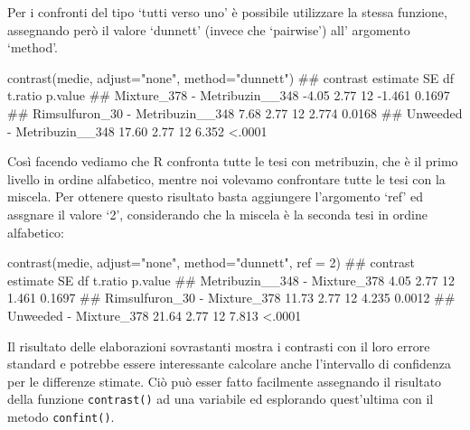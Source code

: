 \documentclass[a4paper,12pt,oneside]{book}
\newenvironment{Shaded}{\begin{snugshade}}{\end{snugshade}}
\newcommand{\DecValTok}[1]{#1}
\newcommand{\StringTok}[1]{#1}
\newcommand{\DocumentationTok}[1]{#1}
\newcommand{\FunctionTok}[1]{#1}
\newcommand{\AttributeTok}[1]{#1}
\newcommand{\NormalTok}[1]{#1}
\begin{document}
\normalsize

Per i confronti del tipo `tutti verso uno' è possibile utilizzare la stessa funzione, assegnando però il valore `dunnett' (invece che `pairwise') all' argomento `method'.

\small

\begin{Shaded}
\begin{Highlighting}[]
\FunctionTok{contrast}\NormalTok{(medie, }\AttributeTok{adjust=}\StringTok{"none"}\NormalTok{, }\AttributeTok{method=}\StringTok{"dunnett"}\NormalTok{)}
\DocumentationTok{\#\#  contrast                         estimate   SE df t.ratio p.value}
\DocumentationTok{\#\#  Mixture\_378 {-} Metribuzin\_\_348       {-}4.05 2.77 12  {-}1.461  0.1697}
\DocumentationTok{\#\#  Rimsulfuron\_30 {-} Metribuzin\_\_348     7.68 2.77 12   2.774  0.0168}
\DocumentationTok{\#\#  Unweeded {-} Metribuzin\_\_348          17.60 2.77 12   6.352  \textless{}.0001}
\end{Highlighting}
\end{Shaded}

\normalsize

Così facendo vediamo che R confronta tutte le tesi con metribuzin, che è il primo livello in ordine alfabetico, mentre noi volevamo confrontare tutte le tesi con la miscela. Per ottenere questo risultato basta aggiungere l'argomento `ref' ed assgnare il valore `2', considerando che la miscela è la seconda tesi in ordine alfabetico:

\small

\begin{Shaded}
\begin{Highlighting}[]
\FunctionTok{contrast}\NormalTok{(medie, }\AttributeTok{adjust=}\StringTok{"none"}\NormalTok{, }\AttributeTok{method=}\StringTok{"dunnett"}\NormalTok{, }\AttributeTok{ref =} \DecValTok{2}\NormalTok{)}
\DocumentationTok{\#\#  contrast                      estimate   SE df t.ratio p.value}
\DocumentationTok{\#\#  Metribuzin\_\_348 {-} Mixture\_378     4.05 2.77 12   1.461  0.1697}
\DocumentationTok{\#\#  Rimsulfuron\_30 {-} Mixture\_378     11.73 2.77 12   4.235  0.0012}
\DocumentationTok{\#\#  Unweeded {-} Mixture\_378           21.64 2.77 12   7.813  \textless{}.0001}
\end{Highlighting}
\end{Shaded}

\normalsize

Il risultato delle elaborazioni sovrastanti mostra i contrasti con il loro errore standard e potrebbe essere interessante calcolare anche l'intervallo di confidenza per le differenze stimate. Ciò può esser fatto facilmente assegnando il risultato della funzione \texttt{contrast()} ad una variabile ed esplorando quest'ultima con il metodo \texttt{confint()}.
\end{document}
